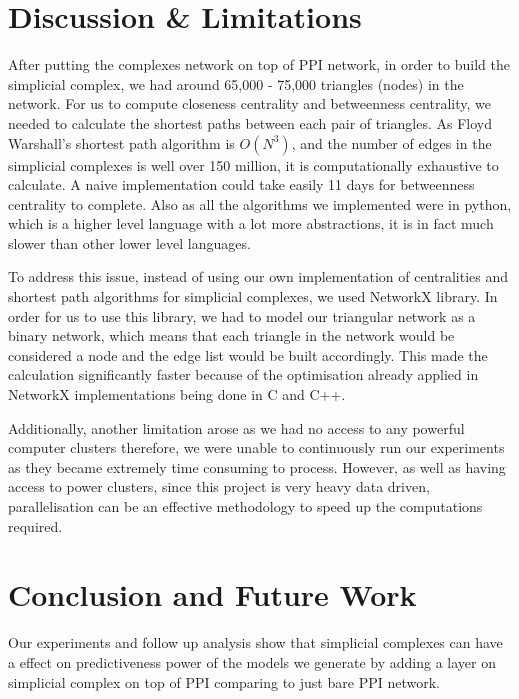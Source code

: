 \documentclass[9pt]{article}
\begin{document}
{\section{Discussion \& Limitations} 
After putting the complexes network on top of PPI network, in order to build the simplicial complex, we had around 65,000 - 75,000 triangles (nodes) in the network. For us to compute closeness centrality and betweenness centrality, we needed to calculate the shortest paths between each pair of triangles. As Floyd Warshall’s shortest path algorithm is $O(N^3)$, and the number of edges in the simplicial complexes is well over 150 million, it is computationally exhaustive to calculate. A naive implementation could take easily 11 days for betweenness centrality to complete. Also as all the algorithms we implemented were in python, which is a higher level language with a lot more abstractions, it is in fact much slower than other lower level languages.

To address this issue, instead of using our own implementation of centralities and shortest path algorithms for simplicial complexes, we used NetworkX library. In order for us to use this library, we had to model our triangular network as a binary network, which means that each triangle in the network would be considered a node and the edge list would be built accordingly. This made the calculation significantly faster because of the optimisation already applied in NetworkX implementations being done in C and C++.

Additionally, another limitation arose as we had no access to any powerful computer clusters therefore, we were unable to continuously run our experiments as they became extremely time consuming to process. However, as well as having access to power clusters, since this project is very heavy data driven, parallelisation can be an effective methodology to speed up the computations required.   

\section{Conclusion and Future Work}
Our experiments and follow up analysis show that simplicial complexes can have a effect 
on predictiveness power of the models we generate by adding a layer on simplicial complex on top of PPI comparing to just bare PPI network. 

}
\end{document}
